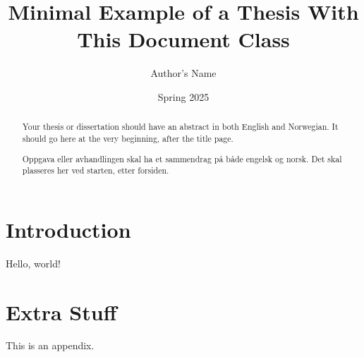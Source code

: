 \documentclass[master,USenglish]{thesis}
\title{Minimal Example of a Thesis With This Document Class}
\author{Author's Name}
\date{Spring 2025}
\begin{document}
\maketitle

\frontmatter

\begin{abstract}

Your thesis or dissertation should have an abstract in both English and Norwegian. It should go here at the very beginning, after the title page.

\end{abstract}

\begin{otherlanguage}{norsk}
\begin{abstract}

Oppgava eller avhandlingen skal ha et sammendrag på både engelsk og norsk. Det skal plasseres her ved starten, etter forsiden.

\end{abstract}
\end{otherlanguage}

\tableofcontents

\mainmatter

\chapter{Introduction}

Hello, world!

\appendix

\chapter{Extra Stuff}

This is an appendix.
\end{document}
